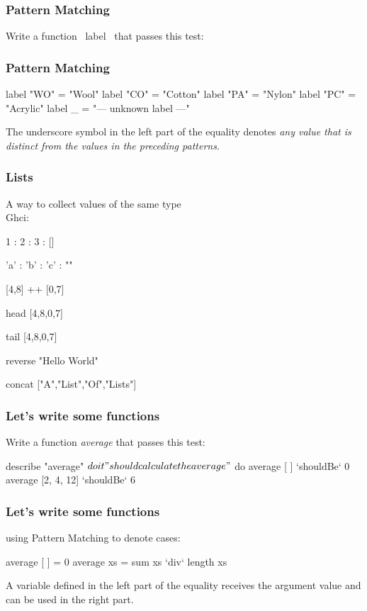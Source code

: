 \documentclass[11pt,xcolor={dvipsnames}]{beamer}
\newcommand{\tc}{\textcolor}
\newcommand{\key}[1]{\tc{orange}{#1}}
\newcommand{\rk}{\enskip{\key{$\hookleftarrow$}}}
\newcommand{\vs}{\vspace{1em}}
\begin{document}
\begin{frame}[fragile]
\frametitle{Pattern Matching}
Write a function ~label~ that passes this test:
\end{frame}
\begin{frame}[fragile]
\frametitle{Pattern Matching}
\begin{haskell}
label "WO" = "Wool"
label "CO" = "Cotton"
label "PA" = "Nylon"
label "PC" = "Acrylic"
label   _  = "--- unknown label ---"
\end{haskell}
The underscore symbol in the left part of the equality denotes \emph{any value that is distinct from the values in the preceding patterns}.
\end{frame}
\begin{frame}[fragile]
\frametitle{Lists}
A way to collect values of the same type\\
Ghci:
\begin{term}
1 : 2 : 3 : []\rk

'a' : 'b' : 'c' : ""\rk

[4,8] ++ [0,7]\rk

head [4,8,0,7]\rk

tail [4,8,0,7]\rk

reverse "Hello World"\rk

concat ["A","List","Of","Lists"]\rk
\end{term}
\end{frame}
\begin{frame}[fragile]
\frametitle{Let's write some functions}
Write a function \emph{average} that passes this test:
\vs
\begin{hspec}
    describe "average" $ do
        it "should calculate the average" $ do
            average [ ]        `shouldBe` 0
            average [2, 4, 12] `shouldBe` 6
\end{hspec}
\end{frame}
\begin{frame}[fragile]
\frametitle{Let's write some functions}
using Pattern Matching to denote cases: 
\vs
\begin{haskell}
average [ ]  = 0
average xs   = sum xs `div` length xs
\end{haskell}
\vs
A variable defined in the left part of the equality receives the argument value and can be used in the right part.
\end{frame}
\end{document}
